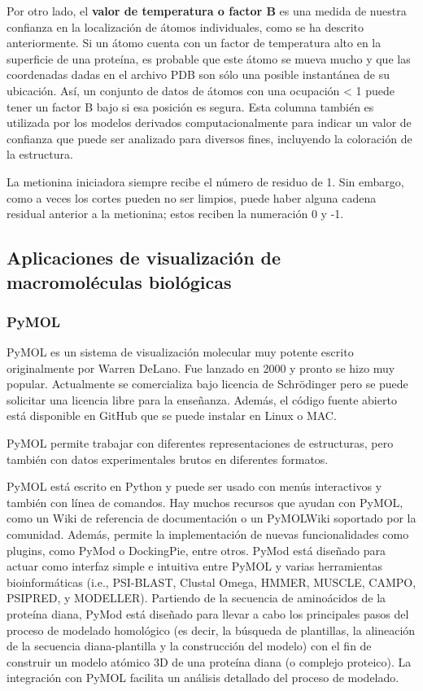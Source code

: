 Por otro lado, el \textbf{valor de temperatura o factor B} es una medida de nuestra confianza en la localización de átomos individuales, como se ha descrito anteriormente. Si un átomo cuenta con un factor de temperatura alto en la superficie de una proteína, es probable que este átomo se mueva mucho y que las coordenadas dadas en el archivo PDB son sólo una posible instantánea de su ubicación. Así, un conjunto de datos de átomos con una ocupación < 1 puede tener un factor B bajo si esa posición es segura. 
Esta columna también es utilizada por los modelos derivados computacionalmente para indicar un valor de confianza que puede ser analizado para diversos fines, incluyendo la coloración de la estructura.

La metionina iniciadora siempre recibe el número de residuo de 1. Sin embargo, como a veces los cortes pueden no ser limpios, puede haber alguna cadena residual anterior a la metionina; estos reciben la numeración 0 y -1.

\subsection{Aplicaciones de visualización de macromoléculas biológicas}
\subsubsection{PyMOL}
PyMOL es un sistema de visualización molecular muy potente escrito originalmente por Warren DeLano. Fue lanzado en 2000 y pronto se hizo muy popular. Actualmente se comercializa bajo licencia de Schrödinger pero se puede solicitar una licencia libre para la enseñanza. Además, el código fuente abierto está disponible en GitHub que se puede instalar en Linux o MAC. 

PyMOL permite trabajar con diferentes representaciones de estructuras, pero también con datos experimentales brutos en diferentes formatos.

PyMOL está escrito en Python y puede ser usado con menús interactivos y también con línea de comandos. Hay muchos recursos que ayudan con PyMOL, como un Wiki de referencia de documentación o un PyMOLWiki soportado por la comunidad. Además, permite la implementación de nuevas funcionalidades como plugins, como PyMod o DockingPie, entre otros. PyMod está diseñado para actuar como interfaz simple e intuitiva entre PyMOL y varias herramientas bioinformáticas (i.e., PSI-BLAST, Clustal Omega, HMMER, MUSCLE, CAMPO, PSIPRED, y MODELLER). Partiendo de la secuencia de aminoácidos de la proteína diana, PyMod está diseñado para llevar a cabo los principales pasos del proceso de modelado homológico (es decir, la búsqueda de plantillas, la alineación de la secuencia diana-plantilla y la construcción del modelo) con el fin de construir un modelo atómico 3D de una proteína diana (o complejo proteico). La integración con PyMOL facilita un análisis detallado del proceso de modelado.

